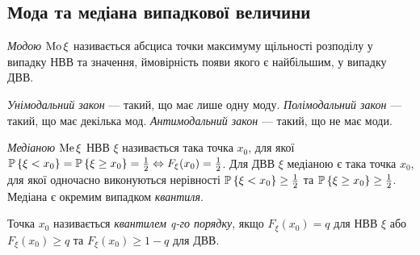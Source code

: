 \subsection{Мода та медіана випадкової величини}
\begin{definition}
    \emph{Модою} $\Mo\xi$ називається абсциса точки максимуму щільності 
    розподілу у випадку НВВ та значення, ймовірність 
    появи якого є найбільшим, у випадку ДВВ.

    \emph{Унімодальний закон} --- такий, що має лише одну моду. 
    \emph{Полімодальний закон} --- такий, що має декілька мод.
    \emph{Антимодальний закон} --- такий, що не має моди.
\end{definition}
\begin{definition}
    \emph{Медіаною} $\Me\xi$ НВВ $\xi$ називається така точка $x_0$, для якої 
    $\P\left\{\xi < x_0\right\} = \P\left\{\xi \geq x_0\right\} 
    = \frac{1}{2} \Leftrightarrow F_\xi(x_0) = \frac{1}{2}$.
    Для ДВВ $\xi$ медіаною є така точка $x_0$, для якої одночасно
    виконуються нерівності $\P\left\{\xi < x_0\right\} \geq \frac{1}{2}$ та
    $\P\left\{\xi \geq x_0\right\} \geq \frac{1}{2}$.
    Медіана є окремим випадком \emph{квантиля}.
\end{definition}
\begin{definition}
    Точка $x_0$ називається \emph{квантилем q-го порядку}, якщо $F_\xi(x_0) = q$ 
    для НВВ $\xi$ або $F_\xi(x_0) \geq q$ та $F_\xi(x_0) \geq 1-q$ для ДВВ.
\end{definition}
